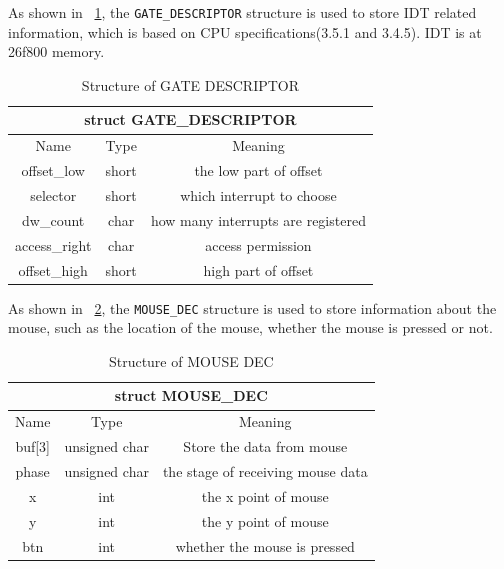 \documentclass{swfcthesis}
\begin{document}
As shown in ~\ref{tab:GATE-DESCRIPTOR}, the \texttt{GATE\_DESCRIPTOR} structure is used to
store IDT related information, which is based on CPU specifications(3.5.1 and
3.4.5\cite{intel_3a}). IDT is at 26f800 memory.
\begin{table}[!htbp]
  \centering
  \begin{tabular}[c]{|c|c|c|}
    \hline
    \multicolumn{3}{|c|}{struct GATE\_DESCRIPTOR} \\
    \hline
    Name & Type & Meaning \\
    \hline
    offset\_low & short & the low part of offset \\
    \hline
    selector & short & which interrupt to choose \\
    \hline
    dw\_count & char & how many interrupts are registered \\
    \hline
    access\_right & char & access permission \\
    \hline
    offset\_high & short & high part of offset \\
    \hline
    
  \end{tabular}
  \caption{Structure of GATE DESCRIPTOR}
  \label{tab:GATE-DESCRIPTOR}
\end{table}

As shown in ~\ref{tab:MOUSE-DEC}, the \texttt{MOUSE\_DEC} structure is used to store
information about the mouse, such as the location of the mouse, whether the mouse is
pressed or not.

\begin{table}[!htbp]
  \centering
  \begin{tabular}[c]{|c|c|c|}
    \hline
    \multicolumn{3}{|c|}{struct MOUSE\_DEC} \\
    \hline
    Name & Type & Meaning \\
    \hline
    buf[3] & unsigned char & Store the data from mouse \\
    \hline
    phase & unsigned char & the stage of receiving mouse data \\
    \hline
    x & int & the x point of mouse \\
    \hline
    y & int & the y point of mouse \\
    \hline
    btn & int & whether the mouse is pressed \\
    \hline
  \end{tabular}
  \caption{Structure of MOUSE DEC}
  \label{tab:MOUSE-DEC}
\end{table}
\end{document}
